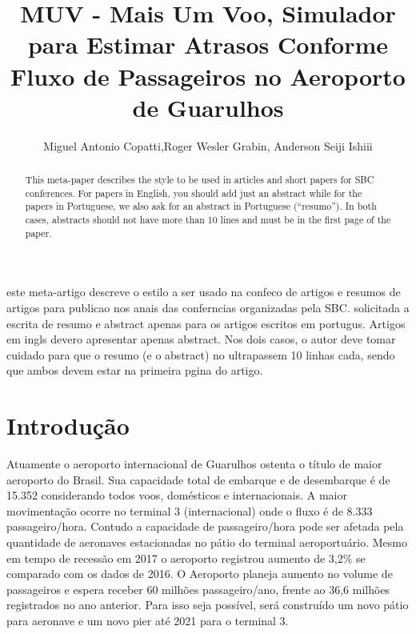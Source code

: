 \documentclass[12pt]{article}
\title{MUV - Mais Um Voo, Simulador para Estimar Atrasos Conforme Fluxo de
  Passageiros no Aeroporto de Guarulhos}
\author{Miguel Antonio Copatti\inst{1},Roger Wesler Grabin\inst{2}, Anderson Seiji Ishiii\inst{3}}
\begin{document}
 

\maketitle

\begin{abstract}
  This meta-paper describes the style to be used in articles and short papers
  for SBC conferences. For papers in English, you should add just an abstract
  while for the papers in Portuguese, we also ask for an abstract in
  Portuguese (``resumo''). In both cases, abstracts should not have more than
  10 lines and must be in the first page of the paper.
\end{abstract}
     
\begin{resumo} 


  este meta-artigo descreve o estilo a ser usado na confeco de artigos e
  resumos de artigos para publicao nos anais das conferncias organizadas
  pela SBC. solicitada a escrita de resumo e abstract apenas para os artigos
  escritos em portugus. Artigos em ingls devero apresentar apenas abstract.
  Nos dois casos, o autor deve tomar cuidado para que o resumo (e o abstract)
  no ultrapassem 10 linhas cada, sendo que ambos devem estar na primeira
  pgina do artigo.
\end{resumo}


\section{Introdução}

  Atuamente o aeroporto internacional de Guarulhos ostenta o título de maior
  aeroporto do Brasil. Sua capacidade total de embarque e de desembarque é
  de 15.352 considerando todos voos, domésticos e internacionais. A maior
  movimentação ocorre no terminal 3 (internacional) onde o fluxo  é de
  8.333 passageiro/hora. Contudo a capacidade de passageiro/hora pode ser 
  afetada pela quantidade de aeronaves estacionadas no pátio do terminal
  aeroportuário. Mesmo em tempo de recessão em 2017 o aeroporto registrou 
  aumento de 3,2\% se comparado com os dados de 2016. O Aeroporto planeja
  aumento no volume de passageiros e espera receber 60 milhões passageiro/ano,
  frente ao 36,6 milhões registrados no ano anterior. Para isso seja possível,
  será construído um novo pátio para aeronave e um novo pier até 2021 para o 
  terminal 3.
\end{document}
